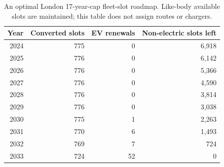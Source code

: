 \begin{table}[htbp]
\centering
\begin{tabular}{@{}rrrr@{}}
\toprule
Year & Converted slots & EV renewals & Non-electric slots left\\
\midrule
2024 & 775 & 0 & 6,918\\
2025 & 776 & 0 & 6,142\\
2026 & 776 & 0 & 5,366\\
2027 & 776 & 0 & 4,590\\
2028 & 776 & 0 & 3,814\\
2029 & 776 & 0 & 3,038\\
2030 & 775 & 1 & 2,263\\
2031 & 770 & 6 & 1,493\\
2032 & 769 & 7 & 724\\
2033 & 724 & 52 & 0\\
\bottomrule
\end{tabular}
\caption{An optimal London 17-year-cap fleet-slot roadmap. Like-body available slots are maintained; this table does not assign routes or chargers.}
\end{table}
